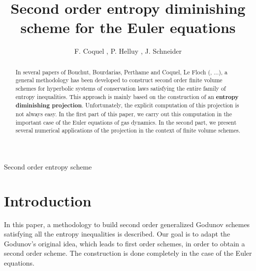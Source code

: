 \documentclass{fldauth}
\theoremstyle{plain}
\theoremstyle{plain}
\theoremstyle{plain}
\theoremstyle{plain}
\theoremstyle{plain}
\theoremstyle{plain}
\begin{document}

 {Second order entropy
scheme}

\title{Second order entropy diminishing scheme for the Euler equations}


\author{F. Coquel , P. Helluy \comma\corrauth, J. Schneider
}

\address{ Laboratoire d'Analyse Num\'erique, Universit\'e Paris VI,
France,  Laboratoire ANAM/MNC, Université de Toulon,
France}



 
\noaccepted{}



\begin{abstract}
In several papers of Bouchut, Bourdarias, Perthame and Coquel, Le
Floch (\cite{bouchut_pertham93}, \cite{coquel_lefloch95}...), a
general methodology has been developed to construct second order
finite volume schemes for hyperbolic systems of conservation laws
satisfying the entire family of entropy inequalities. This
approach is mainly based on the construction of an \textbf{entropy
diminishing projection}. Unfortunately, the explicit computation
of this projection is not always easy. In the first part of this
paper, we carry out this computation in the important case of the
Euler equations of gas dynamics. In the second part, we present
several numerical applications of the projection in the context of
finite volume schemes.
\end{abstract}


\section*{Introduction}

In this paper, a methodology to build second order generalized
Godunov schemes satisfying all the entropy inequalities is
described. Our goal is to adapt the Godunov's original idea, which
leads to first order schemes, in order to obtain a second order
scheme. The construction is done completely in the case of the
Euler equations.
\end{document}
